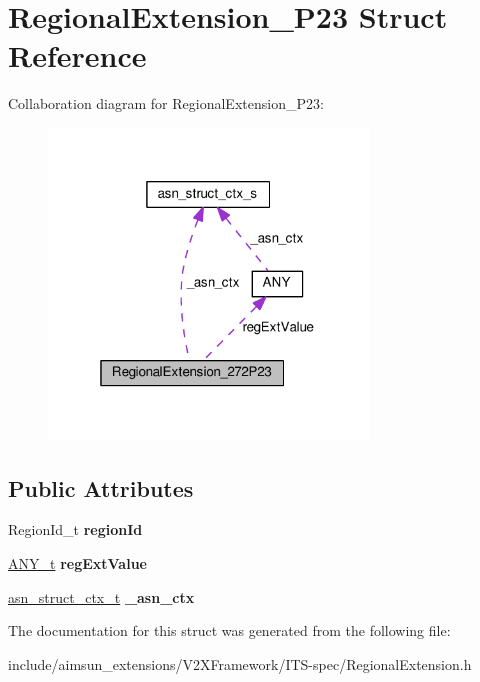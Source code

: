 \hypertarget{structRegionalExtension__272P23}{}\section{Regional\+Extension\+\_\+P23 Struct Reference}
\label{structRegionalExtension__272P23}


Collaboration diagram for Regional\+Extension\+\_\+P23\+:\nopagebreak
\begin{figure}[H]
\begin{center}
\leavevmode
\includegraphics[width=241pt]{structRegionalExtension__272P23__coll__graph}
\end{center}
\end{figure}
\subsection*{Public Attributes}
\begin{DoxyCompactItemize}
\item 
Region\+Id\+\_\+t {\bfseries region\+Id}\hypertarget{structRegionalExtension__272P23_a2afb7f592c59df01ccb2d90235d615f5}{}\label{structRegionalExtension__272P23_a2afb7f592c59df01ccb2d90235d615f5}

\item 
\hyperlink{structANY}{A\+N\+Y\+\_\+t} {\bfseries reg\+Ext\+Value}\hypertarget{structRegionalExtension__272P23_a7620def533696d0e814edaa1ce32f753}{}\label{structRegionalExtension__272P23_a7620def533696d0e814edaa1ce32f753}

\item 
\hyperlink{structasn__struct__ctx__s}{asn\+\_\+struct\+\_\+ctx\+\_\+t} {\bfseries \+\_\+asn\+\_\+ctx}\hypertarget{structRegionalExtension__272P23_a36e9cb2abbd7ca48c77ee74dad3cfe67}{}\label{structRegionalExtension__272P23_a36e9cb2abbd7ca48c77ee74dad3cfe67}

\end{DoxyCompactItemize}


The documentation for this struct was generated from the following file\+:\begin{DoxyCompactItemize}
\item 
include/aimsun\+\_\+extensions/\+V2\+X\+Framework/\+I\+T\+S-\/spec/Regional\+Extension.\+h\end{DoxyCompactItemize}
